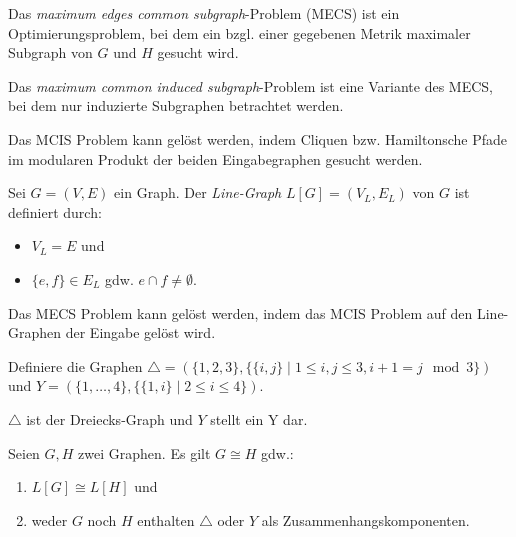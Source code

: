 \begin{definition}
    Das \textit{maximum edges common subgraph}-Problem (MECS) ist ein Optimierungsproblem, bei dem ein bzgl. einer gegebenen Metrik maximaler Subgraph von $ G $ und $ H $ gesucht wird.
\end{definition}

\begin{definition}
    Das \textit{maximum common induced subgraph}-Problem ist eine Variante des MECS, bei dem nur induzierte Subgraphen betrachtet werden.
\end{definition}

\begin{remark}
    Das MCIS Problem kann gelöst werden, indem Cliquen bzw. Hamiltonsche Pfade im modularen Produkt der beiden Eingabegraphen gesucht werden.
\end{remark}

\begin{definition}
    Sei $ G = (V, E) $ ein Graph.
    Der \textit{Line-Graph} $ L[G] = (V_L, E_L) $ von $ G $ ist definiert durch:
    \begin{itemize}
        \item $ V_L = E $ und
        \item $ \{ e, f \} \in E_L $ gdw. $ e \cap f \ne \emptyset $.
    \end{itemize}
\end{definition}

\begin{remark}
    Das MECS Problem kann gelöst werden, indem das MCIS Problem auf den Line-Graphen der Eingabe gelöst wird.
\end{remark}

\begin{definition}
    Definiere die Graphen $ \triangle = (\{ 1, 2, 3 \}, \{ \{ i, j \} \mid 1 \leq i, j \leq 3, i + 1 = j \mod 3 \}) $ und $ Y = (\{ 1, \dots, 4 \}, \{ \{ 1, i \} \mid 2 \leq i \leq 4 \}) $.
\end{definition}

\begin{remark}
    $ \triangle $ ist der Dreiecks-Graph und $ Y $ stellt ein Y dar.
\end{remark}

\begin{theorem}
    Seien $ G, H $ zwei Graphen.
    Es gilt $ G \cong H $ gdw.:
    \begin{enumerate}
        \item $ L[G] \cong L[H] $ und
        \item weder $ G $ noch $ H $ enthalten $ \triangle $ oder $ Y $ als Zusammenhangskomponenten.
    \end{enumerate}
\end{theorem}
